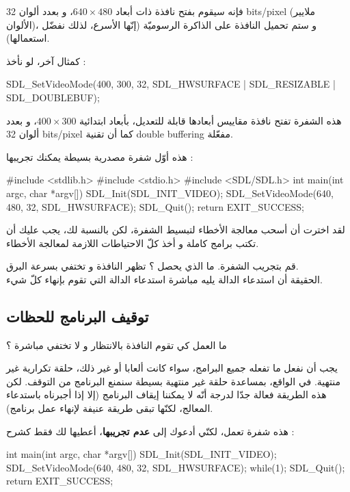 فإنه سيقوم بفتح نافذة ذات أبعاد
$640 \times 480$،
 و بعدد ألوان
\textenglish{32 bits/pixel}
(ملايير الألوان)، و ستم تحميل النافذة على الذاكرة الرسوميّة (إنّها الأسرع، لذلك نفضّل استعمالها).

كمثال آخر، لو نأخذ :

\begin{Csource}
SDL_SetVideoMode(400, 300, 32, SDL_HWSURFACE | SDL_RESIZABLE | SDL_DOUBLEBUF);
\end{Csource}

هذه الشفرة تفتح نافذة مقاييس  أبعادها قابلة للتعديل، بأبعاد ابتدائية 
$400 \times 300$،
و بعدد ألوان 
\textenglish{32 bits/pixel}
كما أن تقنية 
\textenglish{double buffering}
مفعّلة.

هذه أوّل شفرة مصدرية بسيطة يمكنك تجريبها :

\begin{Csource}
#include <stdlib.h>
#include <stdio.h>
#include <SDL/SDL.h>
int main(int argc, char *argv[])
{
	SDL_Init(SDL_INIT_VIDEO);
	SDL_SetVideoMode(640, 480, 32, SDL_HWSURFACE);
	SDL_Quit();
	return EXIT_SUCCESS;
}
\end{Csource}

لقد اخترت أن أسحب معالجة الأخطاء لتبسيط الشفرة، لكن بالنسبة لك، يجب عليك أن تكتب برامج كاملة و أخذ كلّ الاحتياطات اللازمة لمعالجة الأخطاء.

قم بتجريب الشفرة.
ما الذي يحصل ؟ تظهر النافذة و تختفي بسرعة البرق.\\
الحقيقة أن استدعاء الدالة
يليه مباشرة استدعاء الدالة
التي تقوم بإنهاء كلّ شيء.

\subsection{توقيف البرنامج للحظات}

\begin{question}
ما العمل كي تقوم النافذة بالانتظار و لا تختفي مباشرة ؟
\end{question}

يجب أن نفعل ما تفعله جميع البرامج، سواء كانت ألعابا أو غير ذلك، حلقة تكرارية غير منتهية. في الواقع، بمساعدة حلقة غير منتهية بسيطة سنمنع البرنامج من التوقف. لكن هذه الطريقة فعالة جدّا لدرجة أنّه لا يمكننا إيقاف البرنامج (إلا إذا أجبرناه باستدعاء المعالج، لكنّها تبقى طريقة عنيفة لإنهاء عمل برنامج).

هذه شفرة تعمل، لكنّي أدعوك إلى
\textbf{عدم تجريبها}،
أعطيها لك فقط كشرح :

\begin{Csource}
int main(int argc, char *argv[])
{
	SDL_Init(SDL_INIT_VIDEO);
	SDL_SetVideoMode(640, 480, 32, SDL_HWSURFACE);
	while(1);
	SDL_Quit();
	return EXIT_SUCCESS;
}
\end{Csource}

